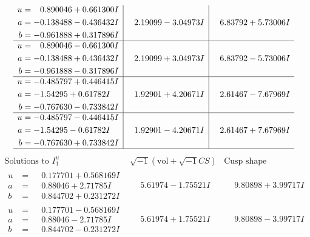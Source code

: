 \documentclass[1p]{elsarticle_modified}
\theoremstyle{definition}
\newcommand{\I}{\sqrt{-1}}
\begin{document}
$$\begin{array}{c|c|c}
\begin{aligned}
u &= \phantom{-}0.890046 + 0.661300 I \\
a &= -0.138488 - 0.436432 I \\
b &= -0.961888 + 0.317896 I\end{aligned}
 & \phantom{-}2.19099 - 3.04973 I & \phantom{-}6.83792 + 5.73006 I \\ \hline\begin{aligned}
u &= \phantom{-}0.890046 - 0.661300 I \\
a &= -0.138488 + 0.436432 I \\
b &= -0.961888 - 0.317896 I\end{aligned}
 & \phantom{-}2.19099 + 3.04973 I & \phantom{-}6.83792 - 5.73006 I \\ \hline\begin{aligned}
u &= -0.485797 + 0.446415 I \\
a &= -1.54295 + 0.61782 I \\
b &= -0.767630 - 0.733842 I\end{aligned}
 & \phantom{-}1.92901 + 4.20671 I & \phantom{-}2.61467 - 7.67969 I \\ \hline\begin{aligned}
u &= -0.485797 - 0.446415 I \\
a &= -1.54295 - 0.61782 I \\
b &= -0.767630 + 0.733842 I\end{aligned}
 & \phantom{-}1.92901 - 4.20671 I & \phantom{-}2.61467 + 7.67969 I\\
 \hline 
 \end{array}$$\newpage$$\begin{array}{c|c|c}  
\text{Solutions to }I^u_{1}& \I (\text{vol} + \sqrt{-1}CS) & \text{Cusp shape}\\
 \hline 
\begin{aligned}
u &= \phantom{-}0.177701 + 0.568169 I \\
a &= \phantom{-}0.88046 + 2.71785 I \\
b &= \phantom{-}0.844702 + 0.231272 I\end{aligned}
 & \phantom{-}5.61974 - 1.75521 I & \phantom{-}9.80898 + 3.99717 I \\ \hline\begin{aligned}
u &= \phantom{-}0.177701 - 0.568169 I \\
a &= \phantom{-}0.88046 - 2.71785 I \\
b &= \phantom{-}0.844702 - 0.231272 I\end{aligned}
 & \phantom{-}5.61974 + 1.75521 I & \phantom{-}9.80898 - 3.99717 I \\ \hline\begin{aligned}

\end{aligned}
\end{array}$$
\end{document}
